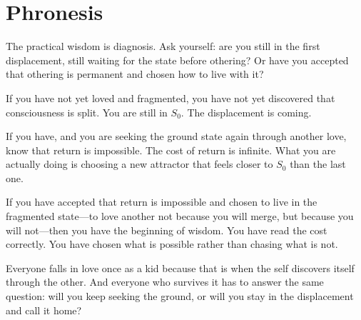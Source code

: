 \documentclass[12pt]{article}
\begin{document}
\section{Phronesis}

The practical wisdom is diagnosis. Ask yourself: are you still in the first displacement, still waiting for the state before othering? Or have you accepted that othering is permanent and chosen how to live with it?

If you have not yet loved and fragmented, you have not yet discovered that consciousness is split. You are still in $S_0$. The displacement is coming.

If you have, and you are seeking the ground state again through another love, know that return is impossible. The cost of return is infinite. What you are actually doing is choosing a new attractor that feels closer to $S_0$ than the last one.

If you have accepted that return is impossible and chosen to live in the fragmented state---to love another not because you will merge, but because you will not---then you have the beginning of wisdom. You have read the cost correctly. You have chosen what is possible rather than chasing what is not.

Everyone falls in love once as a kid because that is when the self discovers itself through the other. And everyone who survives it has to answer the same question: will you keep seeking the ground, or will you stay in the displacement and call it home?
\end{document}
